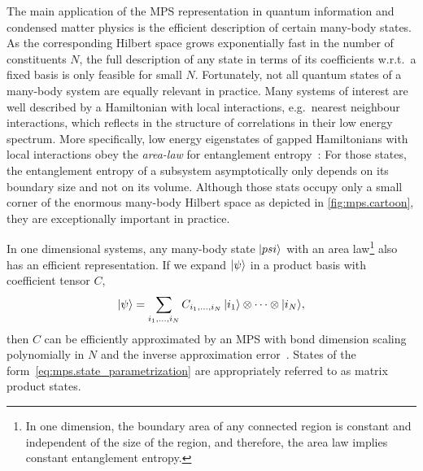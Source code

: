 \begin{figure*}[t]
  \centering
  \caption{\label{fig:mps.cartoon}%
    The manifold of quantum states with an efficient MPS description occupies only a tiny corner in the full Hilbert space.
  }
\end{figure*}

The main application of the MPS representation in quantum information and condensed matter physics is the efficient description of certain many-body states.
As the corresponding Hilbert space grows exponentially fast in the number of constituents $N$, the full description of any state in terms of its coefficients w.r.t.\ a fixed basis is only feasible for small $N$.
Fortunately, not all quantum states of a many-body system are equally relevant in practice.
Many systems of interest are well described by a Hamiltonian with local interactions, e.g.\ nearest neighbour interactions, which reflects in the structure of correlations in their low energy spectrum.
More specifically, low energy eigenstates of gapped Hamiltonians with local interactions obey the \emph{area-law} for entanglement entropy~\cite{Hastings_2006_Solving,Verstraete_2006_Matrix,Eisert_2010_Colloquium}:
For those states, the entanglement entropy of a subsystem asymptotically only depends on its boundary size and not on its volume.
Although those stats occupy only a small corner of the enormous many-body Hilbert space as depicted in \cref{fig:mps.cartoon}, they are exceptionally important in practice.

In one dimensional systems, any many-body state $\ket{psi}$ with an area law\footnote{%
  In one dimension, the boundary area of any connected region is constant and independent of the size of the region, and therefore, the area law implies constant entanglement entropy.
}
also has an efficient representation.
If we expand $\ket{\psi}$ in a product basis with coefficient tensor $C$,
\[
  \ket\psi = \sum_{i_1,\ldots,i_N} C_{i_1,\ldots,i_N} \, \ket{i_1} \otimes \cdots \otimes \ket{i_N},
  \label{eq:mps.state_parametrization}
\]
then $C$ can be efficiently approximated by an MPS with bond dimension scaling polynomially in $N$ and the inverse approximation error~\cite{Hastings_2006_Solving,Verstraete_2006_Matrix,Eisert_2010_Colloquium,Arad_2013_Area,Arad_2016_Rigorous}.
States of the form~\eqref{eq:mps.state_parametrization} are appropriately referred to as matrix product states.

